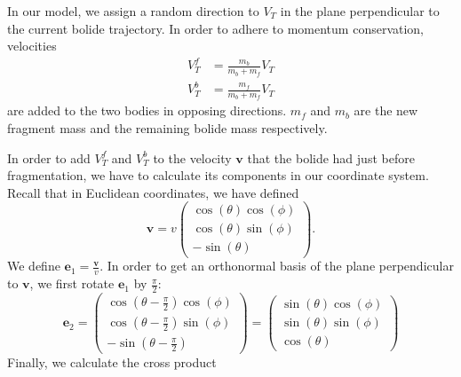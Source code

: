 In our model, we assign a random direction to $V_T$ in the plane perpendicular to the current bolide trajectory.
In order to adhere to momentum conservation, velocities
\begin{align}
    V_T^f &= \frac{m_b}{m_b + m_f}V_T \\
    V_T^b &= \frac{m_f}{m_b + m_f}V_T
    \label{eq:v_t_star}
\end{align}
are added to the two bodies in opposing directions.
$m_f$ and $m_b$ are the new fragment mass and the remaining bolide mass respectively.

In order to add $V_T^f$ and $V_T^b$ to the velocity $\pmb{v}$ that the bolide had just before fragmentation,
we have to calculate its components in our coordinate system.
Recall that in Euclidean coordinates, we have defined
\begin{equation*}
    \pmb{v} = v \begin{pmatrix}
        \cos(\theta)\cos(\phi) \\
        \cos(\theta)\sin(\phi) \\
        -\sin(\theta)
    \end{pmatrix}.
\end{equation*}
We define $\pmb{e}_1 = \frac{\pmb{v}}{v}$.
In order to get an orthonormal basis of the plane perpendicular to $\pmb{v}$, we first rotate $\pmb{e}_1$ by $\frac{\pi}{2}$:
\begin{equation*}
    \pmb{e}_2 = \begin{pmatrix}
        \cos\left(\theta - \frac{\pi}{2}\right)\cos(\phi) \\
        \cos\left(\theta - \frac{\pi}{2}\right)\sin(\phi) \\
        -\sin\left(\theta - \frac{\pi}{2}\right)
    \end{pmatrix} = \begin{pmatrix}
        \sin(\theta)\cos(\phi) \\
        \sin(\theta)\sin(\phi) \\
        \cos(\theta)
    \end{pmatrix}
\end{equation*}
Finally, we calculate the cross product
